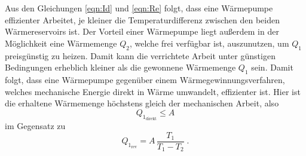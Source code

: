 Aus den Gleichungen \ref{eqn:Id} und \ref{eqn:Re} folgt, dass eine Wärmepumpe effizienter Arbeitet, je kleiner die Temperaturdifferenz
zwischen den beiden Wärmereservoirs ist. Der Vorteil einer Wärmepumpe liegt außerdem in der Möglichkeit eine Wärmemenge $Q_2$, welche frei verfügbar ist, 
auszunutzen, um $Q_1$ preisgünstig zu heizen. Damit kann die verrichtete Arbeit unter günstigen Bedingungen erheblich kleiner als die gewonnene Wärmemenge $Q_1$ sein.
Damit folgt, dass eine Wärmepumpe gegenüber einem Wärmegewinnungsverfahren, welches mechanische Energie direkt in Wärme umwandelt, effizienter ist.
Hier ist die erhaltene Wärmemenge höchstens gleich der mechanischen Arbeit, also
\begin{equation*}
    Q_{1_\text{direkt}}\leq A
\end{equation*}
im Gegensatz zu
\begin{equation*}
    Q_{1_\text{rev}}=A\,\frac{T_1}{T_1-T_2} \; \text{.}
\end{equation*}
